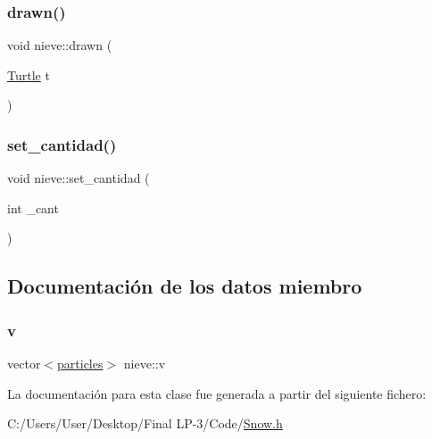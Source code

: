 \subsubsection{\texorpdfstring{drawn()}{drawn()}}
{\footnotesize\ttfamily void nieve\+::drawn (\begin{DoxyParamCaption}\item[{\mbox{\hyperlink{class_turtle}{Turtle}}}]{t }\end{DoxyParamCaption})\hspace{0.3cm}{\ttfamily [inline]}}

\mbox{\label{classnieve_a447ff743623611b1dd3bfe617e40d52e}} 
\subsubsection{\texorpdfstring{set\_cantidad()}{set\_cantidad()}}
{\footnotesize\ttfamily void nieve\+::set\+\_\+cantidad (\begin{DoxyParamCaption}\item[{int}]{\+\_\+cant }\end{DoxyParamCaption})\hspace{0.3cm}{\ttfamily [inline]}}



\subsection{Documentación de los datos miembro}
\mbox{\label{classnieve_a53571bcacc0b6d8ba54823c9f03df3e9}} 
\subsubsection{\texorpdfstring{v}{v}}
{\footnotesize\ttfamily vector$<$\mbox{\hyperlink{classparticles}{particles}}$>$ nieve\+::v}



La documentación para esta clase fue generada a partir del siguiente fichero\+:\begin{DoxyCompactItemize}
\item 
C\+:/\+Users/\+User/\+Desktop/\+Final L\+P-\/3/\+Code/\mbox{\hyperlink{_snow_8h}{Snow.\+h}}\end{DoxyCompactItemize}

